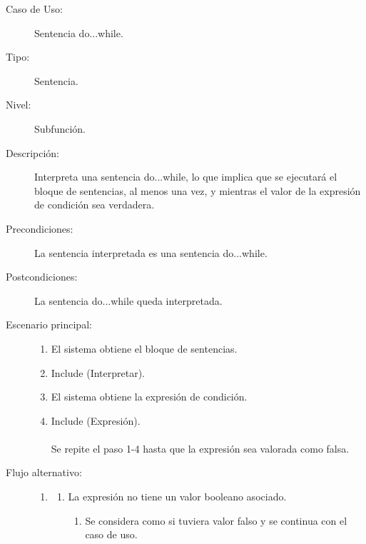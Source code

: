 \begin{framed}
\FloatBarrier
\begin{description}
   \item[Caso de Uso:]  Sentencia do...while.
   \item [Tipo:] Sentencia.
   \item[Nivel:]  Subfunción.
   \item[Descripción:] 
   Interpreta una sentencia do...while, lo que implica que se ejecutará 
   el bloque de sentencias, al menos una vez, y mientras el valor de la expresión
   de condición sea verdadera.
   \item[Precondiciones:] 
   La sentencia interpretada es una sentencia do...while.
   \item[Postcondiciones:] 
   La sentencia do...while queda interpretada.
   \item[Escenario principal:] \hfill
   \begin{enumerate}
   \item El sistema obtiene el bloque de sentencias.
   \item Include (Interpretar). 
   \item El sistema obtiene la expresión de condición.
   \item Include (Expresión).\\\\ \hfill
      Se repite el paso 1-4 hasta que la expresión sea valorada como falsa.
   \end{enumerate}
   \item[Flujo alternativo:] \hfill 
   \begin{enumerate} \itemsep1pt \parskip0pt 
   \setcounter{enumi}{3}
   \renewcommand{\labelenumi}{}
   \renewcommand{\labelenumiii}{\arabic{enumiii}.}
   \renewcommand{\labelenumii}{\arabic{enumi}\alph{enumii}.}
      \item 
      \begin {enumerate}
         \setcounter{enumii}{0}
         \item La expresión no tiene un valor booleano asociado.
         \begin{enumerate}
         \item Se considera como si tuviera valor falso y se continua con el caso de uso.
         \end{enumerate}
      \end{enumerate}
   \end{enumerate}
\end{description}
 \FloatBarrier
\end{framed}
